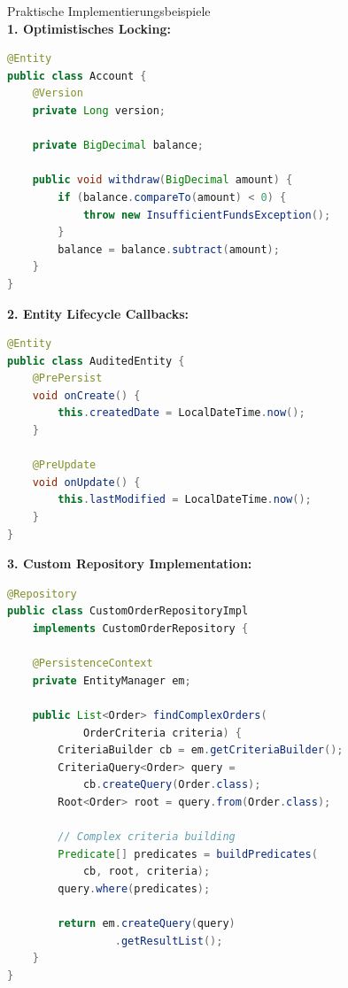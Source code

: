 \begin{example2}{Praktische Implementierungsbeispiele}\\
\textbf{1. Optimistisches Locking:}
\begin{lstlisting}[language=Java, style=basesmol]
@Entity
public class Account {
    @Version
    private Long version;
    
    private BigDecimal balance;
    
    public void withdraw(BigDecimal amount) {
        if (balance.compareTo(amount) < 0) {
            throw new InsufficientFundsException();
        }
        balance = balance.subtract(amount);
    }
}
\end{lstlisting}

\textbf{2. Entity Lifecycle Callbacks:}
\begin{lstlisting}[language=Java, style=basesmol]
@Entity
public class AuditedEntity {
    @PrePersist
    void onCreate() {
        this.createdDate = LocalDateTime.now();
    }
    
    @PreUpdate
    void onUpdate() {
        this.lastModified = LocalDateTime.now();
    }
}
\end{lstlisting}

\textbf{3. Custom Repository Implementation:}
\begin{lstlisting}[language=Java, style=basesmol]
@Repository
public class CustomOrderRepositoryImpl 
    implements CustomOrderRepository {
    
    @PersistenceContext
    private EntityManager em;
    
    public List<Order> findComplexOrders(
            OrderCriteria criteria) {
        CriteriaBuilder cb = em.getCriteriaBuilder();
        CriteriaQuery<Order> query = 
            cb.createQuery(Order.class);
        Root<Order> root = query.from(Order.class);
        
        // Complex criteria building
        Predicate[] predicates = buildPredicates(
            cb, root, criteria);
        query.where(predicates);
        
        return em.createQuery(query)
                 .getResultList();
    }
}
\end{lstlisting}
\end{example2}


